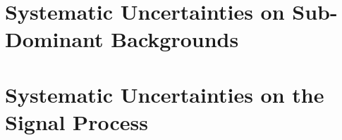 



\section{Systematic Uncertainties on Sub-Dominant Backgrounds}


\section{Systematic Uncertainties on the Signal Process}





